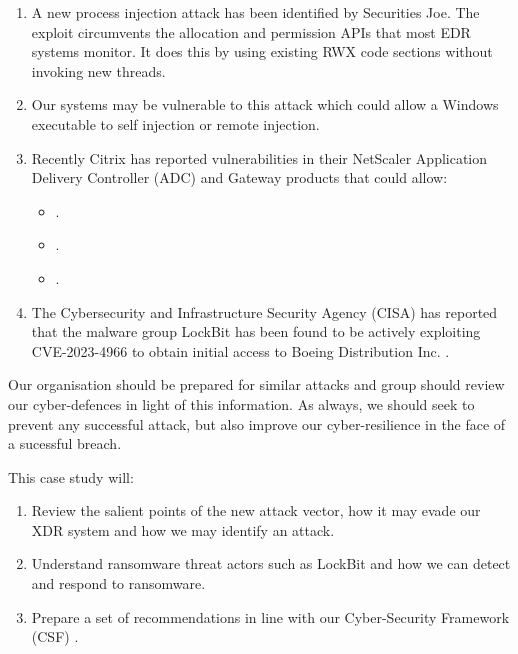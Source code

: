 \begin{enumerate}
\item A new process injection attack has been identified by Securities Joe.  The exploit circumvents the allocation
  and permission APIs that most EDR systems monitor.  It  does this by using existing RWX code sections without invoking
  new threads.
\item Our systems may be vulnerable to this attack which could allow a Windows executable to self injection or remote injection.
\item Recently Citrix has reported vulnerabilities in their NetScaler Application Delivery Controller (ADC) and Gateway products that
  could allow:
  \begin{itemize}
  \item {} \autocite{CVE-2023-3467}.
  \item {} \autocite{CVE-2023-3519}.
  \item {} \autocite{CVE-2023-4966}.
  \end{itemize}
\item The Cybersecurity and Infrastructure Security Agency (CISA) has reported that the malware group LockBit \autocite{CISA:2023a} has
  been found to be actively exploiting CVE-2023-4966 to obtain initial access to Boeing Distribution Inc. \autocite{CISA:2023b}.
\end{enumerate}

Our organisation should be prepared for similar attacks and group should review our cyber-defences in light of this information.
As always, we should seek to prevent any successful attack, but also improve our cyber-resilience in the face of a sucessful breach.

This case study will:
\begin{enumerate}
\item Review the salient points of the new attack vector, how it may evade our XDR system and how we may identify an attack.
\item Understand ransomware threat actors such as LockBit and how we can detect and respond to ransomware.
\item Prepare a set of recommendations in line with our Cyber-Security Framework (CSF) \autocite{NIST:2018}.
\end{enumerate}



